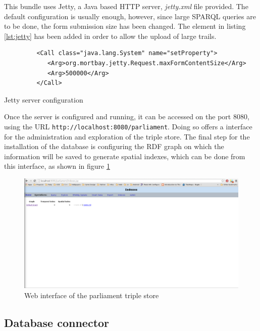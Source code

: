 This bundle uses Jetty, a Java based HTTP server, \textit{jetty.xml} file provided. The default configuration is usually enough, however, since large SPARQL queries are to be done, the form submission size has been changed. The element in listing \ref{lst:jetty} has been added in order to allow the upload of large trails.

\begin{listing}[ht]\centering
  \begin{minipage}{.6\textwidth}
    \begin{verbatim}
	     <Call class="java.lang.System" name="setProperty">
	        <Arg>org.mortbay.jetty.Request.maxFormContentSize</Arg>
	        <Arg>500000</Arg>
	     </Call>
    \end{verbatim}
  \end{minipage}
  \caption{Jetty server configuration}\label{lst:jetty}
\end{listing}

Once the server is configured and running, it can be accessed on the port 8080, using the URL \texttt{http://localhost:8080/parliament}. Doing so offers a interface for the administration and exploration of the triple store. The final step for the installation of the database is configuring the RDF graph on which the information will be saved to generate spatial indexes, which can be done from this interface, as shown in figure \ref{fig:parliament}

\begin{figure}[ht]
  \centering
  \includegraphics[width=.8\textwidth]{fig/parliament}
  \caption{Web interface of the parliament triple store}
  \label{fig:parliament}
\end{figure} 

\subsection{Database connector}

